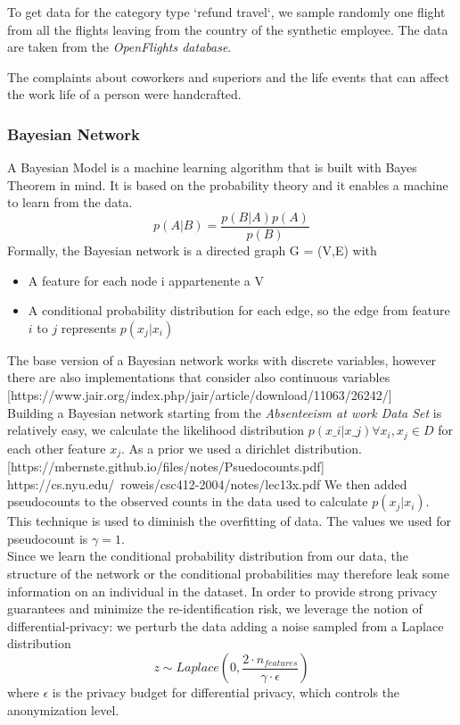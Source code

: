 \documentclass{article}
\begin{document}
To get data for the category type `refund travel`, we sample randomly one flight from all the flights leaving from the country of the synthetic employee. The data are taken from the \textit{OpenFlights database}.

The complaints about coworkers and superiors and the life events that can affect the work life of a person were handcrafted.

\subsubsection{Bayesian Network}
A Bayesian Model is a machine learning algorithm that is built with Bayes Theorem in mind.  It is based on the probability theory and it enables a machine to learn from the data.
\begin{equation}
    p(A|B) = \frac{p(B|A)p(A)}{p(B)}
\end{equation}
Formally, the Bayesian network is a directed graph G = (V,E) with
\begin{itemize}
    \item A feature for each node i appartenente a V
    \item A conditional probability distribution for each edge, so the edge from feature $i$ to $j$ represents $p(x_j| x_i)$
  \end{itemize}
The base version of a Bayesian network works with discrete variables, however there are also implementations that consider also continuous variables [https://www.jair.org/index.php/jair/article/download/11063/26242/] \\
Building a Bayesian network starting from the \textit{Absenteeism at work Data Set} is relatively easy, we calculate the likelihood distribution $p(x\_i|x\_j) \forall x_i, x_j \in D$ for each other feature $x_j$. As a prior we used a dirichlet distribution. 
[https://mbernste.github.io/files/notes/Psuedocounts.pdf]
https://cs.nyu.edu/~roweis/csc412-2004/notes/lec13x.pdf
We then added pseudocounts to the observed counts in the data used to calculate $p(x_j| x_i)$. This technique is used to diminish the overfitting of data. The values we used for pseudocount is $\gamma=1$. \\
Since we learn the conditional probability distribution from our data, the structure of the network or the conditional probabilities may therefore leak some information on an individual in the dataset. In order to provide strong privacy guarantees and minimize
the re-identification risk, we leverage the notion of differential-privacy: we perturb the data adding a noise sampled from a Laplace distribution 
\begin{equation}
    z \sim Laplace(0, \frac{2 \cdot n_{features}}{\gamma \cdot \epsilon})
\end{equation}
where $\epsilon$ is the privacy budget for differential privacy, which controls the anonymization level.
\end{document}
